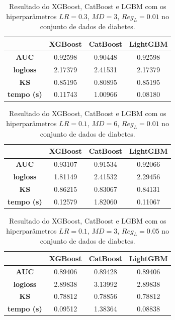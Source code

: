 \begin{table}[H]
\label{res:dia:3}
\centering
\begin{tabular}{|c|c|c|c|}
\hline
	& \textbf{XGBoost} &\textbf{CatBoost} & \textbf{LightGBM} \\
\hline
\textbf{AUC}	& 0.92598	&0.90448	&0.92598\\
\hline
\textbf{logloss}	& 2.17379	&2.41531	&2.17379\\
\hline
\textbf{KS}	& 0.85195	& 0.80895 &	0.85195 \\
\hline
\textbf{tempo (s)}	& 0.11743&	1.00966&	0.08180 \\
\hline
\end{tabular}
\caption{Resultado do XGBoost, CatBoost e LGBM com os hiperparâmetros $LR=0.3$, $MD=3$, $Reg_L=0.01$ no conjunto de dados de diabetes.}
\end{table}

\begin{table}[H]
\label{res:dia:4}
\centering
\begin{tabular}{|c|c|c|c|}
\hline
	& \textbf{XGBoost} &\textbf{CatBoost} & \textbf{LightGBM} \\
\hline
\textbf{AUC}	& 0.93107&	0.91534	&0.92066\\
\hline
\textbf{logloss}	& 1.81149	&2.41532	&2.29456\\
\hline
\textbf{KS}	& 0.86215	& 0.83067	& 0.84131\\
\hline
\textbf{tempo (s)}	& 0.12579	&1.82060	&0.11067\\
\hline
\end{tabular}
\caption{Resultado do XGBoost, CatBoost e LGBM com os hiperparâmetros $LR=0.1$, $MD=6$, $Reg_L=0.01$ no conjunto de dados de diabetes.}
\end{table}

\begin{table}[H]
\label{res:dia:5}
\centering
\begin{tabular}{|c|c|c|c|}
\hline
	& \textbf{XGBoost} &\textbf{CatBoost} & \textbf{LightGBM} \\
\hline
\textbf{AUC}	& 0.89406	&0.89428	&0.89406\\
\hline
\textbf{logloss}	& 2.89838	&3.13992&	2.89838\\
\hline
\textbf{KS}	& 0.78812&	0.78856 &	0.78812\\
\hline
\textbf{tempo (s)}	& 0.09512	&1.38364	&0.08838\\
\hline
\end{tabular}
\caption{Resultado do XGBoost, CatBoost e LGBM com os hiperparâmetros $LR=0.1$, $MD=3$, $Reg_L=0.05$ no conjunto de dados de diabetes.}
\end{table}

